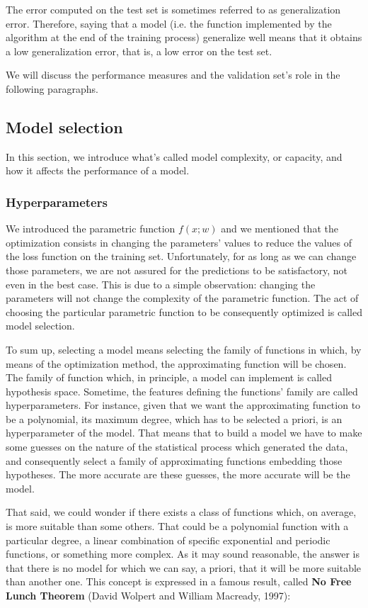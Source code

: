 \documentclass[a4paper, twoside]{article}
\begin{document}
        The error computed on the test set is sometimes referred to as generalization error. Therefore, saying that a model (i.e. the function implemented by the algorithm at the end of the training process) generalize well means that it obtains a low generalization error, that is, a low error on the test set.

        We will discuss the performance measures and the validation set's role in the following paragraphs.

    \subsection{Model selection}
    In this section, we introduce what's called model complexity, or capacity, and how it affects the performance of a model.

        \subsubsection{Hyperparameters}

        We introduced the parametric function $f(x;w)$ and we mentioned that the optimization consists in changing the parameters' values to reduce the values of the loss function on the training set.
        Unfortunately, for as long as we can change those parameters, we are not assured for the predictions to be satisfactory, not even in the best case. This is due to a simple observation: changing the parameters will not change the complexity of the parametric function. The act of choosing the particular parametric function to be consequently optimized is called model selection.

        To sum up, selecting a model means selecting the family of functions in which, by means of the optimization method, the approximating function will be chosen. The family of function which, in principle, a model can implement is called hypothesis space. Sometime, the features defining the functions' family are called hyperparameters. For instance, given that we want the approximating function to be a polynomial, its maximum degree, which has to be selected a priori, is an hyperparameter of the model.
        That means that to build a model we have to make some guesses on the nature of the statistical process which generated the data, and consequently select a family of approximating functions embedding those hypotheses. The more accurate are these guesses, the more accurate will be the model.

        That said, we could wonder if there exists a class of functions which, on average, is more suitable than some others. That could be a polynomial function with a particular degree, a linear combination of specific exponential and periodic functions, or something more complex. As it may sound reasonable, the answer is that there is no model for which we can say, a priori, that it will be more suitable than another one. This concept is expressed in a famous result, called \textbf{No Free Lunch Theorem} (David Wolpert and William Macready, 1997):
\end{document}
